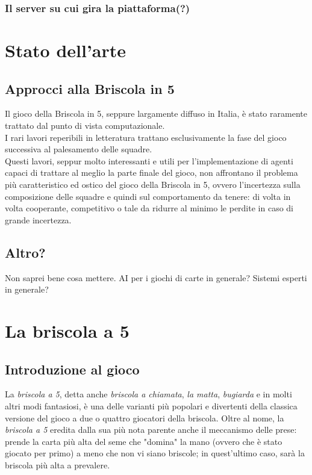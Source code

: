 \documentclass[runningheads,a4paper]{llncs}
\begin{document}
\subsubsection{Il server su cui gira la piattaforma(?)}

\section{Stato dell'arte}
\subsection{Approcci alla Briscola in 5}
Il gioco della Briscola in 5, seppure largamente diffuso in Italia, è stato raramente trattato dal punto di vista computazionale.\\
I rari lavori reperibili in letteratura trattano esclusivamente la fase del gioco successiva al palesamento delle squadre.\\
Questi lavori, seppur molto interessanti e utili per l'implementazione di agenti capaci di trattare al meglio la parte finale del gioco, non affrontano il problema più caratteristico ed ostico del gioco della Briscola in 5, ovvero l'incertezza sulla composizione delle squadre e quindi sul comportamento da tenere: di volta in volta cooperante, competitivo o tale da ridurre al minimo le perdite in caso di grande incertezza.


\subsection{Altro?}
Non saprei bene cosa mettere.
AI per i giochi di carte in generale?
Sistemi esperti in generale?


\section{La briscola a 5}
\subsection{Introduzione al gioco}

La \emph{briscola a 5}, detta anche \emph{briscola a chiamata}, \emph{la matta}, \emph{bugiarda} e in molti altri modi fantasiosi, è una delle varianti più popolari e divertenti della classica versione del gioco a due o quattro giocatori della briscola.
Oltre al nome, la \emph{briscola a 5} eredita dalla sua più nota parente anche il meccanismo delle prese: prende la carta più alta del seme che "domina" la mano (ovvero che è stato giocato per primo) a meno che non vi siano briscole; in quest'ultimo caso, sarà la briscola più alta a prevalere.
\end{document}
